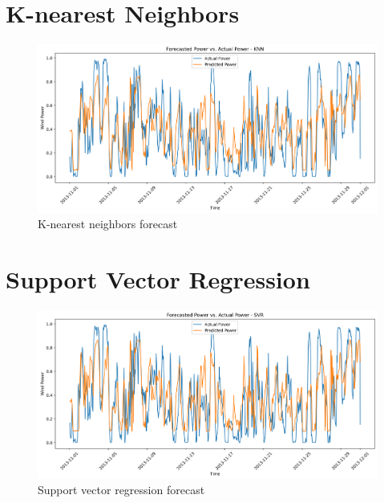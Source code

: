 \documentclass[a4paper, article, oneside, USenglish, IN5460]{memoir}
\begin{document}
\section{K-nearest Neighbors}
\begin{figure}[H]
    \centering
    \includegraphics[width=1\linewidth]{fig/q1-KNN-forecast.png}
    \caption{K-nearest neighbors forecast}
    \label{fig:q1-LR-forecast}
\end{figure}

\section{Support Vector Regression}
\begin{figure}[H]
    \centering
    \includegraphics[width=1\linewidth]{fig/q1-SVR-forecast.png}
    \caption{Support vector regression forecast}
    \label{fig:q1-LR-forecast}
\end{figure}
\end{document}

